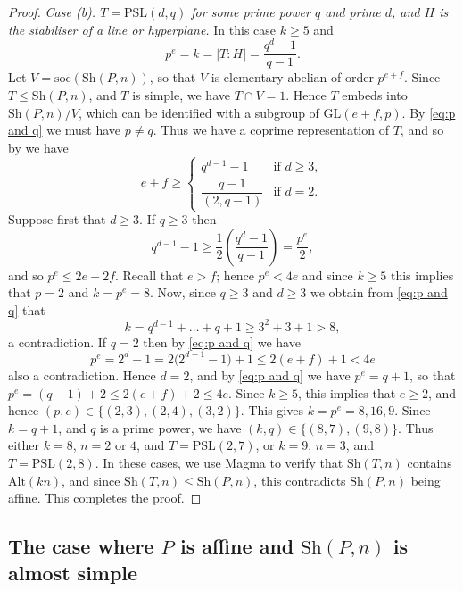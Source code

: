 \documentclass[12pt]{amsart}
\theoremstyle{remark}
\theoremstyle{definition}
\newcommand{\soc}{\mathrm{soc}}
\newcommand{\PSL}{\mathrm{PSL}}
\newcommand{\alt}{\mathrm{Alt}}
\newcommand{\sh}{\mathrm{Sh}}
\begin{document}
\begin{proof}
\medskip\noindent
\emph{Case (b). $T = \mathrm{PSL}(d,q)$ for some prime power $q$ and prime $d$, and $H$ is the stabiliser of a line or hyperplane.} In this case $k\geqslant 5$ and
	\begin{equation} \label{eq:p and q}
	p^e = k = |T:H| = \frac{q^d-1}{q-1}.
	\end{equation}
Let $V = \soc(\sh(P,n))$, so that $V$ is elementary abelian of order $p^{e+f}$. Since $T \leqslant \sh(P,n)$, and $T$ is simple, we have $T \cap V = 1$. Hence $T$ embeds into $\sh(P,n)/V$, which can be identified with a subgroup of $\mathrm{GL}(e+f,p)$. By \eqref{eq:p and q} we must have $p \neq q$. Thus we have a coprime representation of $T$, and so by \cite[Theorem 5.3.9]{KL} we have 
	\[ 
	e+f \geqslant \begin{cases} q^{d-1} - 1 &  \text{if $d \geqslant 3$}, \\ \dfrac{q-1}{(2,q-1)} & \text{if $d = 2$}.\end{cases} 
	\]
Suppose first that $d \geqslant 3$. If $q \geqslant 3$ then
	\[ 
	q^{d-1} - 1  \geqslant \frac{1}{2} \left( \frac{q^d - 1}{q-1} \right) = \frac{p^e}{2}, 
	\]
and so $p^e \leqslant 2e + 2f$. Recall that $e > f$; hence $p^e < 4e$ and since $k\geqslant5$ this implies that $p = 2$ and $k = p^e =8$. Now, since $q \geqslant 3$ and $d \geqslant 3$ we obtain from \eqref{eq:p and q} that
	\[ 
	k =  q^{d-1} + \dots + q + 1 \geqslant 3^2 + 3 + 1 > 8, 
	\]
a contradiction. If $q = 2$ then by \eqref{eq:p and q} we have 
	\[ 
	p^e = 2^d - 1 = 2\big( 2^{d-1} - 1 \big) + 1 \leqslant 2(e+f) + 1 < 4e 
	\]
also a contradiction. Hence  $d = 2$, and by \eqref{eq:p and q} we have $p^e = q+1$, so that $p^e = (q-1) + 2 \leqslant 2(e+f) + 2 \leqslant 4e$. Since
$k\geqslant5$, this implies that $e \geqslant 2$, and hence $(p,e) \in \{ (2,3), (2,4), (3,2) \}$. This gives $k = p^e = 8,16,9$. Since $k = q+1$, and $q$ is a prime power, we have $(k,q) \in \{(8,7), (9,8)\}$. Thus either $k = 8$, $n =2$ or $4$, and $T = \PSL(2,7)$, or $k = 9$, $n = 3$, and $T = \PSL(2,8)$. In these cases, we use {\sc Magma} to verify that $\sh(T,n)$ contains $\alt(kn)$, and since $\sh(T,n) \leqslant \sh(P,n)$, this contradicts $\sh(P,n)$ being affine. This completes the proof.  
\end{proof}

\subsection{The case where $P$ is affine and $\sh(P,n)$ is almost simple}
\end{document}
